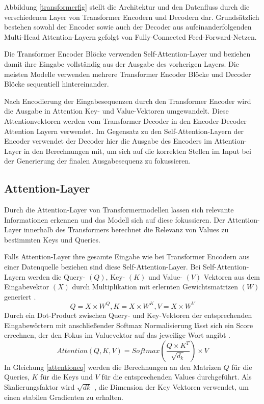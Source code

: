 Abbildung \ref{transformerfig} stellt die Architektur und den Datenfluss durch die verschiedenen Layer von Transformer Encodern und Decodern dar. 
Grundsätzlich bestehen sowohl der Encoder sowie auch der Decoder aus aufeinanderfolgenden Multi-Head Attention-Layern gefolgt von Fully-Connected Feed-Forward-Netzen.


Die Transformer Encoder Blöcke verwenden Self-Attention-Layer und beziehen damit ihre Eingabe vollständig aus der Ausgabe des vorherigen Layers. 
Die meisten Modelle verwenden mehrere Transformer Encoder Blöcke und Decoder Blöcke sequentiell hintereinander.

Nach Encodierung der Eingabesequenzen durch den Transformer Encoder wird die Ausgabe in Attention Key- und Value-Vektoren umgewandelt.
Diese Attentionvektoren werden vom Transformer Decoder in den Encoder-Decoder Attention Layern verwendet.
Im Gegensatz zu den Self-Attention-Layern der Encoder verwendet der Decoder hier die Ausgabe des Encoders im Attention-Layer in den Berechnungen mit, um sich auf die korrekten Stellen im Input bei der Generierung der finalen Ausgabesequenz zu fokussieren.






\subsection{Attention-Layer} %
\label{attention}
Durch die Attention-Layer von Transformermodellen lassen sich relevante Informationen erkennen und das Modell sich auf diese fokussieren. 
Der Attention-Layer innerhalb des Transformers berechnet die Relevanz von Values zu bestimmten Keys und Queries. 

Falls Attention-Layer ihre gesamte Eingabe wie bei Transformer Encodern aus einer Datenquelle beziehen sind diese Self-Attention-Layer.
Bei Self-Attention-Layern werden die Query- $(Q)$, Key- $(K)$ und Value- $(V)$ Vektoren aus dem Eingabevektor $(X)$ durch Multiplikation mit erlernten Gewichtsmatrizen $(W)$ generiert \citep{AttentionIALYN}. 
\begin{equation}
    Q = X \times W^{Q}, K = X \times W^{K}, V = X \times W^{V}
\end{equation}
Durch ein Dot-Product zwischen Query- und Key-Vektoren der entsprechenden Eingabewörtern mit anschließender Softmax Normalisierung lässt sich ein Score errechnen, der den Fokus im Valuevektor auf das jeweilige Wort angibt \citep{AttentionIALYN}.
\begin{equation}
    \label{attentioneq}
    Attention(Q,K,V) = Softmax(\frac{Q\times K^T}{\sqrt{d_k}})\times V
\end{equation}
In Gleichung \ref{attentioneq} werden die Berechnungen an den Matrizen $Q$ für die Queries, $K$ für die Keys und $V$ für die entsprechenden Values durchgeführt. Als Skalierungsfaktor wird $\sqrt{dk}$ , die Dimension der Key Vektoren verwendet, um einen stabilen Gradienten zu erhalten. 


